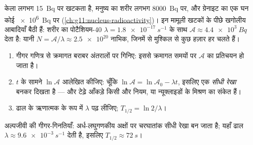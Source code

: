 \begin{example}[विशाल $N$, नन्हा $\lambda$]\label{ex:g12:radioactive-decay:body}
केला लगभग \qty{15}{Bq} पर खटकता है, मनुष्य का शरीर लगभग \qty{8000}{Bq} पर, और ग्रेनाइट का
एक घन  कोई \qty{e6}{Bq} पर (\cref{ch:g11:nucleus-radioactivity})। इन मामूली खटकों के पीछे खगोलीय
आबादियाँ बैठी हैं: शरीर का पोटैशियम-40 $\lambda =
\qty{1.8e-17}{s^{-1}}$ के साथ $\mathcal A \approx \qty{4.4e3}{Bq}$ देता है: यानी
$N = \mathcal A/\lambda \approx \num{2.5e20}$ नाभिक, जिनमें से मुश्किल से कुछ हज़ार हर  चलते हैं।
\end{example}

\begin{method}[अर्धायु नापना]\label{met:g12:radioactive-decay:semilog}
\begin{enumerate}
  \item गीगर गणित्र से क्रमागत बराबर अंतरालों पर  गिनिए: इससे क्रमागत
        समयों पर $\mathcal A$ का प्रतिचयन हो जाता है।
  \item $t$ के सामने $\ln \mathcal A$ आलेखित कीजिए: चूँकि $\ln \mathcal A = \ln \mathcal A_0 - \lambda t$, इसलिए
         एक \emph{सीधी रेखा} बनकर दिखता है --- और
        टेढ़े आँकड़े किसी और नियम, या न्यूक्लाइडों के मिश्रण का संकेत
        हैं।
  \item ढाल के ऋणात्मक के रूप में $\lambda$ पढ़ लीजिए; $T_{1/2} = \ln 2/\lambda$।
\end{enumerate}
\end{method}

\begin{omfigure}

{\small अल्पजीवी  की गीगर-गिनतियाँ: अर्ध-लघुगणकीय अक्षों पर
चरघातांक सीधी रेखा बन जाता है; यहाँ ढाल $\lambda \approx \qty{9.6e-3}{s^{-1}}$ देती है, इसलिए $T_{1/2} \approx \qty{72}{s}$।}
\end{omfigure}

